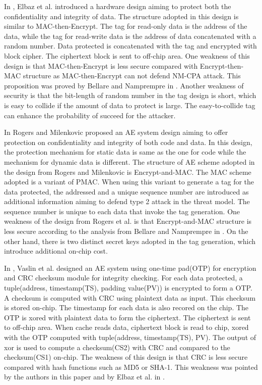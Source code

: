 \documentclass{article}
\begin{document}
In \cite{pc-ice}, Elbaz et al. introduced a hardware design aiming to protect both the confidentiality and integrity of data. The structure adopted in this design is similar to MAC-then-Encrypt. The tag for read-only data is the address of the data, while the tag for read-write data is the address of data concatenated with a random number. Data protected is concatenated with the tag and encrypted with block cipher. The ciphertext block is sent to off-chip area.
One weakness of this design is that MAC-then-Encrypt is less secure compared with Encrypt-then-MAC structure as MAC-then-Encrypt can not defend NM-CPA attack. This proposition was proved by Bellare and Namprempre in \cite{ae-notion}.
Another weakness of security is that the bit-length of random number in the tag design is short, which is easy to collide if the amount of data to protect is large. The easy-to-collide tag can enhance the probability of succeed for the attacker.


In \cite{rogers-MA} Rogers and Milenkovic proposed an AE system design aiming to offer protection on confidentiality and integrity of both code and data. In this design, the protection mechanism for static data is same as the one for code while the mechanism for dynamic data is different.
The structure of AE scheme adopted in the design from Rogers and Milenkovic is Encrypt-and-MAC. The MAC scheme adopted is a variant of PMAC. When using this variant to generate a tag for the data protected, the addressed and a unique sequence number are introduced as additional information aiming to defend type 2 attack in the threat model. The sequence number is unique to each data that invoke the tag generation.
One weakness of the design from Rogers et al. is that Encrypt-and-MAC structure is less secure according to the analysis from Bellare and Namprempre in \cite{ae-notion}. On the other hand, there is two distinct secret keys adopted in the tag generation, which introduce additional on-chip cost.

In \cite{vaslin-MA}, Vaslin et al. designed an AE system using one-time pad(OTP) for encryption and CRC checksum module for integrity checking. For each data protected, a tuple(address, timestamp(TS), padding value(PV)) is encrypted to form a OTP. A checksum is computed with CRC using plaintext data as input. This checksum is stored on-chip. The timestamp for each data is also recored on the chip. The OTP is xored with plaintext data to form the ciphertext. The ciphertext is sent to off-chip area. 
When cache reads data, ciphertext block is read to chip, xored with the OTP computed with tuple(address, timestamp(TS), PV). The output of xor is used to compute a checksum(CS2) with CRC and compared to the checksum(CS1) on-chip. 
The weakness of this design is that CRC is less secure compared with hash functions such as MD5 or SHA-1. This weakness was pointed by the authors in this paper and by Elbaz et al. in \cite{area}.



\end{document}
